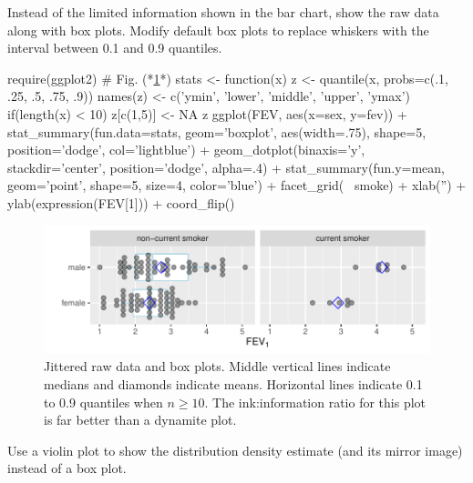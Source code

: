 Instead of the limited information shown in the bar chart, show the
raw data along with box plots.  Modify default box plots to replace
whiskers with the interval between 0.1 and 0.9 quantiles.
\begin{Schunk}
\begin{Sinput}
require(ggplot2)   # Fig. (*\ref{fig:descript-tplot}*)
stats <- function(x) {
  z <- quantile(x, probs=c(.1, .25, .5, .75, .9))
  names(z) <- c('ymin', 'lower', 'middle', 'upper', 'ymax')
  if(length(x) < 10) z[c(1,5)] <- NA
  z
}
ggplot(FEV, aes(x=sex, y=fev)) +
  stat_summary(fun.data=stats, geom='boxplot', aes(width=.75), shape=5,
               position='dodge', col='lightblue') +
  geom_dotplot(binaxis='y', stackdir='center', position='dodge', alpha=.4) +
  stat_summary(fun.y=mean, geom='point', shape=5, size=4, color='blue') +
  facet_grid(~ smoke) +
  xlab('') + ylab(expression(FEV[1])) + coord_flip()
\end{Sinput}
\begin{figure}[htbp]

\centerline{\includegraphics{descript-tplot-1} }

\caption[Dot plot with superimposed box plots]{Jittered raw data and box plots.  Middle vertical lines indicate medians and diamonds indicate means. Horizontal lines indicate 0.1 to 0.9 quantiles when $n\geq 10$.  The ink:information ratio for this plot is far better than a dynamite plot.}\label{fig:descript-tplot}
\end{figure}
\end{Schunk}
Use a violin plot to show the distribution density estimate (and its
mirror image) instead of a box plot.
